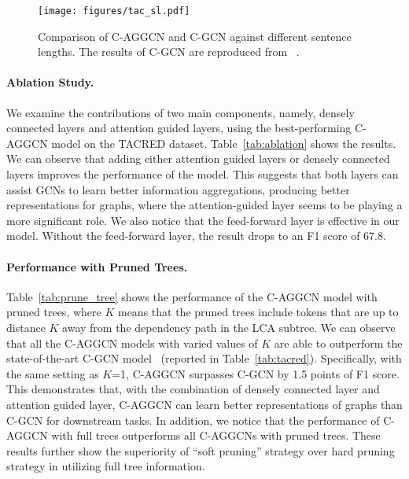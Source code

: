 \documentclass[11pt,a4paper]{article}
\begin{document}
\begin{figure}[!t]
    \centering
    \texttt{[image: figures/tac\_sl.pdf]}
\caption{Comparison of C-AGGCN and C-GCN against different sentence lengths. The results of C-GCN are reproduced from ~\cite{Zhang2018GraphCO}.}
    \label{fig:tac_sl}
\end{figure}


\paragraph{Ablation Study.} We examine the contributions of two main components, namely, densely connected layers and attention guided layers, using the best-performing C-AGGCN model on the TACRED dataset.  Table~\ref{tab:ablation} shows the results. We can observe that adding either attention guided layers or densely connected layers improves the performance of the model. This suggests that both layers can assist GCNs to learn better information aggregations, producing better representations for graphs, where the attention-guided layer seems to be playing a more significant role.  We also notice that the feed-forward layer is  effective in our model. Without the feed-forward layer, the result drops to an F1 score of 67.8.



\paragraph{Performance with Pruned Trees.} Table~\ref{tab:prune_tree} shows the performance of the C-AGGCN model with pruned trees, where $K$ means that the pruned trees include tokens that are up to distance $K$ away from the dependency path in the  LCA subtree. We can observe that all the C-AGGCN models with varied values of $K$ are able to outperform the state-of-the-art C-GCN model~\citep{Zhang2018GraphCO} (reported in Table~\ref{tab:tacred}). Specifically,  with the same setting as $K$=1, C-AGGCN surpasses C-GCN by 1.5 points of F1 score. This demonstrates that, with the combination of densely connected layer and attention guided layer,  C-AGGCN  can learn better representations of graphs than C-GCN for downstream tasks. In addition, we notice that the performance of C-AGGCN with full trees outperforms all C-AGGCNs with pruned trees. These results further show  the superiority of ``soft pruning'' strategy   over hard pruning strategy in utilizing full tree information.
\end{document}
